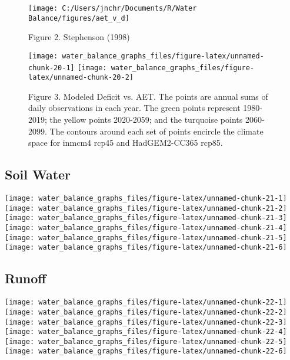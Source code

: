 \documentclass[
]{article}
\begin{document}
\begin{figure}

{\centering \texttt{[image: C:/Users/jnchr/Documents/R/Water Balance/figures/aet\_v\_d]} 

}

\caption{Figure 2. Stephenson (1998)}\label{fig:unnamed-chunk-19}
\end{figure}

\begin{figure}
\texttt{[image: water\_balance\_graphs\_files/figure-latex/unnamed-chunk-20-1]} \texttt{[image: water\_balance\_graphs\_files/figure-latex/unnamed-chunk-20-2]} \caption{Figure 3. Modeled Deficit vs. AET. The points are annual sums of daily observations in each year. The green points represent 1980-2019; the yellow points 2020-2059; and the turquoise points 2060-2099. The contours around each set of points encircle the climate space for inmcm4 rcp45 and HadGEM2-CC365 rcp85.}\label{fig:unnamed-chunk-20}
\end{figure}

\hypertarget{soil-water}{%
\subsection{Soil Water}\label{soil-water}}

\texttt{[image: water\_balance\_graphs\_files/figure-latex/unnamed-chunk-21-1]}
\texttt{[image: water\_balance\_graphs\_files/figure-latex/unnamed-chunk-21-2]}
\texttt{[image: water\_balance\_graphs\_files/figure-latex/unnamed-chunk-21-3]}
\texttt{[image: water\_balance\_graphs\_files/figure-latex/unnamed-chunk-21-4]}
\texttt{[image: water\_balance\_graphs\_files/figure-latex/unnamed-chunk-21-5]}
\texttt{[image: water\_balance\_graphs\_files/figure-latex/unnamed-chunk-21-6]}

\hypertarget{runoff}{%
\subsection{Runoff}\label{runoff}}

\texttt{[image: water\_balance\_graphs\_files/figure-latex/unnamed-chunk-22-1]}
\texttt{[image: water\_balance\_graphs\_files/figure-latex/unnamed-chunk-22-2]}
\texttt{[image: water\_balance\_graphs\_files/figure-latex/unnamed-chunk-22-3]}
\texttt{[image: water\_balance\_graphs\_files/figure-latex/unnamed-chunk-22-4]}
\texttt{[image: water\_balance\_graphs\_files/figure-latex/unnamed-chunk-22-5]}
\texttt{[image: water\_balance\_graphs\_files/figure-latex/unnamed-chunk-22-6]}
\end{document}

